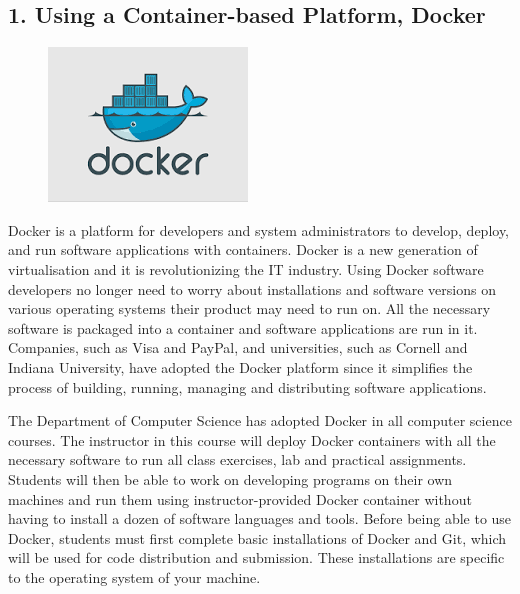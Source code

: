 \subsection*{1. Using a Container-based Platform, Docker}
\begin{figure}[ht!]
	\begin{center}
	 \includegraphics[scale=.45]{graphics/docker.png}
	\end{center}
\end{figure}

Docker is a platform for developers and system administrators to develop, deploy, and run software applications with containers. Docker is a new generation of virtualisation and it is revolutionizing the IT industry. Using Docker software developers no longer need to worry about installations and software versions on various operating systems their product may need to run on. All the necessary software is packaged into a container and software applications are run in it. Companies, such as Visa and PayPal, and universities, such as Cornell and Indiana University, have adopted the Docker platform since it simplifies the process of building, running, managing and distributing software applications. 

\noindent The Department of Computer Science has adopted Docker in all computer science courses. The instructor in this course will deploy Docker containers with all the necessary software to run all class exercises, lab and practical assignments. Students will then be able to work on developing programs on their own machines and run them using instructor-provided Docker container without having to install a dozen of software languages and tools. Before being able to use Docker, students must first complete basic installations of Docker and Git, which will be used for code distribution and submission. These installations are specific to the operating system of your machine. 

